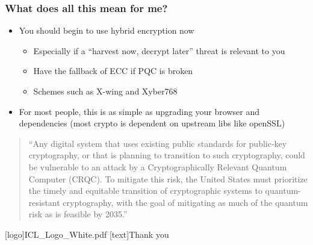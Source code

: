 \documentclass[
aspectratio=169, %
t, %
onlytextwidth, %
10pt, %
]{beamer}
\begin{document}
\begin{frame}
    \frametitle{What does all this mean for me?}
    \begin{adjustwidth}{0cm}{0.15\textwidth} %
        \begin{itemize}
            \item You should begin to use hybrid encryption now
            \begin{itemize}
                \item Especially if a ``harvest now, decrypt later'' threat is relevant to you
                \item Have the fallback of ECC if PQC is broken
                \item Schemes such as X-wing and Xyber768
            \end{itemize}
            \item For most people, this is as simple as upgrading your browser and dependencies (most crypto is dependent on upstream libs like openSSL)
        \end{itemize}
        \vspace{1.5em}
        \begin{quote}
            ``Any digital system that uses existing public standards for public‑key cryptography, or that is planning to transition to such cryptography, could be vulnerable to an attack by a Cryptographically Relevant Quantum Computer (CRQC). To mitigate this risk, the United States must prioritize the timely and equitable transition of cryptographic systems to quantum-resistant cryptography, with the goal of mitigating as much of the quantum risk as is feasible by 2035.''
        \end{quote}
    \end{adjustwidth}
\end{frame}



\begingroup
	[logo]{ICL_Logo_White.pdf} %
	[text]{Thank you} %
	
\endgroup

\end{document}
